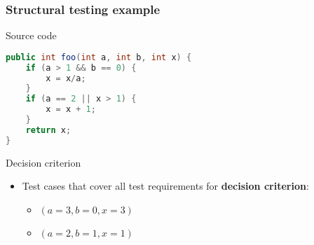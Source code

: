 \begin{frame}[hasprev=true, hasnext=false, fragile]
\frametitle{Structural testing example}

\vspace{-.3cm}
\begin{block}{Source code}
\vspace{-.3cm}
\begin{lstlisting}[language=java]
public int foo(int a, int b, int x) {
	if (a > 1 && b == 0) {
		x = x/a;
	}
	if (a == 2 || x > 1) {
		x = x + 1;
	}
	return x;
}
\end{lstlisting}
\vspace{-.15cm}
\end{block}

\begin{block}{Decision criterion}
\begin{itemize}
	\item Test cases that cover all test requirements for \textbf{decision
	criterion}:
	\begin{itemize}
		\item $(a = 3, b = 0, x = 3)$
		\item $(a = 2, b = 1, x = 1)$
	\end{itemize}
\end{itemize}
\end{block}
\end{frame}

